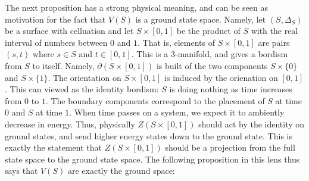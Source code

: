 \documentclass{article}
\theoremstyle{definition}
\numberwithin{figure}{section}
\begin{document}
The next proposition has a strong physical meaning, and can be seen as motivation for the fact that $V(S)$ is a ground state space. Namely, let $(S,\Delta_S)$ be a surface with celluation and let $S\times [0,1]$ be the product of $S$ with the real interval of numbers between $0$ and $1$. That is, elements of $S\times [0,1]$ are pairs $(s,t)$ where $s\in S$ and $t\in [0,1]$. This is a $3$-manifold, and gives a bordism from $S$ to itself. Namely, $\partial (S\times [0,1])$ is built of the two components $S\times \{0\}$ and $S\times \{1\}$. The orientation on $S\times [0,1]$ is induced by the orienation on $[0,1]$. This can viewed as the identity bordism: $S$ is doing nothing as time increases from $0$ to $1$. The boundary components correspond to the placement of $S$ at time $0$ and $S$ at time $1$. When time passes on a system, we expect it to ambiently decrease in energy. Thus,  physically $Z(S\times [0,1])$ should act by the identity on ground states, and send higher energy states down to the ground state. This is exactly the statement that $Z(S\times [0,1])$ should be a projection from the full state space to the ground state space. The following proposition in this lens thus says that $V(S)$ are exactly the ground space:
\end{document}
